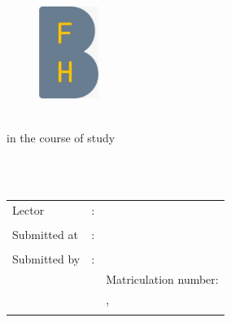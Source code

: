 \begin{titlepage}
\pagestyle{empty}

\begin{flushleft}
\begin{figure}[ht]
\flushleft
\includegraphics[height=3cm]{content/pictures/bfh_logo.jpeg}
\end{figure}
\end{flushleft}

\begin{center}
{\fontsize{18}{22} \selectfont \docKindOfWork}\\[5mm]
{\fontsize{18}{22} \selectfont in the course of study} \\[5mm]
{\fontsize{18}{22} \selectfont \docFieldOfStudy}\\
\vspace{1cm}

\begin{onehalfspace}
{\fontsize{32}{24} \selectfont \docTitle}\\[7mm]
{\fontsize{18}{22} \selectfont \docSecondTitle}


\end{onehalfspace}
\end{center}

\vfill
\begin{center}
\begin{tabular}{lcl}
Lector  		&:& \docFirstLector 	\\ \\
Submitted at	&:& \docHandOverDate 	\\ \\
Submitted by 	&:& \docPrename~\docSurname\\
				& & Matriculation number: \docStudentnumber\\
				& & \docStreet,~\docZip~\docLocation\\
				& & \docEmail
					
\end{tabular}
\end{center}
\end{titlepage}